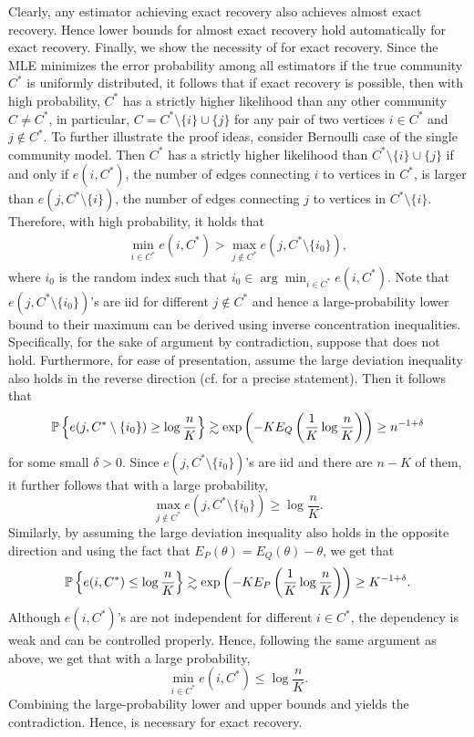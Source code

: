 Clearly, any estimator achieving exact recovery also achieves almost exact recovery. Hence
lower bounds for almost exact recovery hold automatically for exact recovery. 
Finally, we show the necessity of  for exact recovery. Since 
the MLE minimizes the error probability among all estimators if the true community $C^*$ is uniformly
distributed, it follows that if exact recovery is possible, then 
with high probability, $C^*$ has a strictly
higher likelihood than any other community $C \neq C^*$, in particular, $C=C^* \setminus \{i\} \cup \{  j\}$
for any pair of two vertices $i \in C^*$ and $j \notin C^*$. To further illustrate the proof ideas,
consider Bernoulli case of the single community model. Then $C^*$ has a strictly
higher likelihood than $C^* \setminus \{i\} \cup \{  j\}$ if and only if $e(i,C^*)$, the number of edges
connecting $i$ to vertices in $C^*$,  is larger than $e(j, C^* \setminus \{i\})$, the number of edges connecting $j$ to vertices in $C^*\setminus \{i\}$.
Therefore, with high probability, it holds that
\begin{align}
\min_{i \in C^*}  e( i , C^*) > \max_{j \notin C^*} e(j, C^* \setminus \{i_0 \} ) , \label{eq:mle_converse_cond}
\end{align}
where $i_0$ is the random index such that $i_0 \in \arg\min_{i \in C^*} e(i,C^*)$. 
Note that  $e(j, C^* \setminus \{i_0 \} )$'s are iid
for different $j \notin C^*$ and hence  a large-probability lower bound
to their maximum can be derived using inverse concentration inequalities. 
Specifically, for the sake of argument by contradiction, suppose that 
 does not hold. Furthermore, for ease of presentation,
assume the large deviation inequality  also holds in the
reverse direction (cf. \cite[Corollary 5]{HajekWuXu_one_info_lim15} for a precise
statement). Then it follows that 
$$
\mathbb{P}\left\{  e(j, C^* \setminus \{i_0 \} ) \ge \log \frac{n}{K}  \right\} \gtrsim 
\exp \left( - K E_Q \left( \frac{1}{K} \log \frac{n}{K}  \right) \right)
\ge n^{-1+\delta}
$$
for some small $\delta>0$. Since $e(j, C^* \setminus \{i_0 \} )$'s are iid and there
are $n-K$ of them, it further follows that with a large probability, 
$$
\max_{j \notin C^*} e(j, C^* \setminus \{i_0 \} ) \ge \log \frac{n}{K}.
$$
Similarly, by assuming the large deviation inequality  also holds in the
opposite direction and using the fact that $E_P(\theta)=E_Q(\theta)-\theta$, we get that
$$
\mathbb{P}\left\{ e( i , C^*)  \le  \log \frac{n}{K}  \right\} \gtrsim \exp \left( - K E_P \left( \frac{1}{K} \log \frac{n}{K}  \right) \right)
\ge K^{-1+\delta}.
$$
Although $e(i, C^*)$'s are not independent
for different $i \in C^*$, the dependency is weak and can be controlled properly. Hence, following
the same argument as above,  we get that with a large probability, 
$$
\min_{i \in C^*}  e( i , C^*)  \le  \log \frac{n}{K}.
$$
Combining the large-probability lower and upper bounds and  yields 
the contradiction. Hence,  is necessary for exact recovery.




